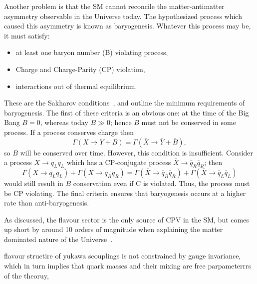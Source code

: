 Another problem is that the SM cannot reconcile the matter-antimatter asymmetry observable in the
Universe today.
The hypothesized process which caused this asymmetry is known as baryogenesis.
Whatever this process may be, it must satisfy:
\begin{itemize}
  \item at least one baryon number (B) violating process,
  \item Charge and Charge-Parity (CP) violation,
  \item interactions out of thermal equilibrium.
\end{itemize}
These are the Sakharov conditions~\cite{1991SvPhU..34..392S}, and outline the minimum requirements
of baryogenesis.
The first of these criteria is an obvious one: at the time of the Big Bang $B=0$, whereas today
$B\gg0$; hence $B$ must not be conserved in some process.
If a process conserves charge then
\begin{equation}
  \Gamma(X\to Y+B)=\Gamma(\bar X \to \bar Y+\bar B),
\end{equation}
so $B$ will be conserved over time.
However, this condition is insufficient.
Consider a process $X\to q_Lq_L$ which has a CP-conjugate process $\bar X\to \bar q_R\bar q_R$;
then
\begin{equation}
  \Gamma(X\to q_Lq_L) + \Gamma(X\to q_Rq_R)
  =
  \Gamma(\bar X\to \bar q_R\bar q_R) + \Gamma(\bar X\to \bar q_L\bar q_L)
\end{equation}
would still result in $B$ conservation even if C is violated.
Thus, the process must be CP violating.
The final criteria ensures that baryogenesis occurs at a higher rate than anti-baryogenesis.

As discussed, the flavour sector is the only source of CPV in the SM, but comes up short by around 10 orders of
magnitude when explaining the matter dominated nature of the Universe~\cite{Cline:2006ts,Huet:1994jb}.




flavour structire of yukawa scouplings is not constrained by gauge invariance, which in turn
implies that quark masses and their mixing are free parpameterrrs of the theoruy,
